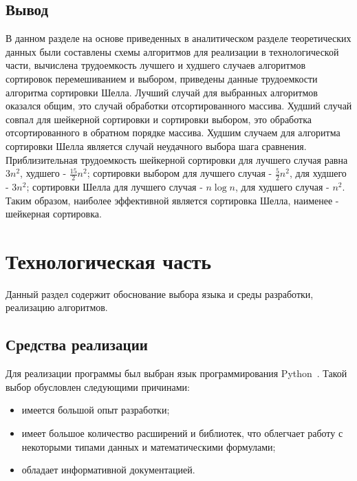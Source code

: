 \documentclass[a4paper,oneside,14pt]{extreport}
\begin{document}
\section{Вывод}
В данном разделе на основе приведенных в аналитическом разделе теоретических данных были составлены схемы алгоритмов для реализации в технологической части, вычислена трудоемкость лучшего и худшего случаев алгоритмов сортировок перемешиванием и выбором, приведены данные трудоемкости алгоритма сортировки Шелла. Лучший случай для выбранных алгоритмов оказался общим, это случай обработки отсортированного массива. Худший случай совпал для шейкерной сортировки и сортировки выбором, это обработка отсортированного в обратном порядке массива. Худшим случаем для алгоритма сортировки Шелла является случай неудачного выбора шага сравнения. Приблизительная трудоемкость шейкерной сортировки для лучшего случая равна $3n^2$, худшего - $\frac{15}{2}n^2$; сортировки выбором для лучшего случая - $\frac{5}{2}n^2$, для худшего - $3n^2$; сортировки Шелла для лучшего случая - $n \log n$, для худшего случая - $n^2$. Таким образом, наиболее эффективной является сортировка Шелла, наименее - шейкерная сортировка.
\newpage

\chapter{Технологическая часть}
Данный раздел содержит обоснование выбора языка и среды разработки, реализацию алгоритмов.

\section{Средства реализации}
Для реализации программы был выбран язык программирования Python~\cite{python}. Такой выбор обусловлен следующими причинами:
\begin{itemize}
	\item имеется большой опыт разработки;
	\item имеет большое количество расширений и библиотек, что облегчает работу с некоторыми типами данных и математическими формулами;
	\item обладает информативной документацией.
\end{itemize}
\end{document}
